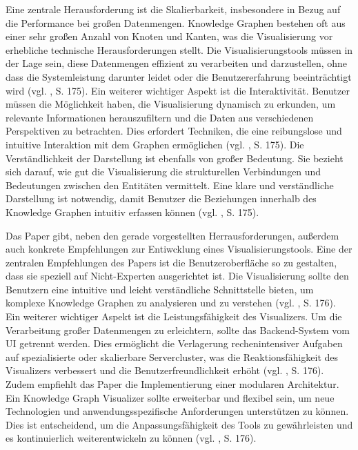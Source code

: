 Eine zentrale Herausforderung ist die Skalierbarkeit, insbesondere in Bezug auf die Performance bei großen Datenmengen. Knowledge Graphen bestehen oft aus einer sehr großen Anzahl von Knoten und Kanten, was die Visualisierung vor erhebliche technische Herausforderungen stellt. Die Visualisierungstools müssen in der Lage sein, diese Datenmengen effizient zu verarbeiten und darzustellen, ohne dass die Systemleistung darunter leidet oder die Benutzererfahrung beeinträchtigt wird (vgl. \cite{kgVisualization:Nararatwong}, S. 175).  Ein weiterer wichtiger Aspekt ist die Interaktivität. Benutzer müssen die Möglichkeit haben, die Visualisierung dynamisch zu erkunden, um relevante Informationen herauszufiltern und die Daten aus verschiedenen Perspektiven zu betrachten. Dies erfordert Techniken, die eine reibungslose und intuitive Interaktion mit dem Graphen ermöglichen (vgl. \cite{kgVisualization:Nararatwong}, S. 175). Die Verständlichkeit der Darstellung ist ebenfalls von großer Bedeutung. Sie bezieht sich darauf, wie gut die Visualisierung die strukturellen Verbindungen und Bedeutungen zwischen den Entitäten vermittelt. Eine klare und verständliche Darstellung ist notwendig, damit Benutzer die Beziehungen innerhalb des Knowledge Graphen intuitiv erfassen können (vgl. \cite{kgVisualization:Nararatwong}, S. 175).

Das Paper gibt, neben den gerade vorgestellten Herrausforderungen, außerdem auch konkrete Empfehlungen zur Entiwcklung eines Visualisierungstools. Eine der zentralen Empfehlungen des Papers ist die Benutzeroberfläche so zu gestalten, dass sie speziell auf Nicht-Experten ausgerichtet ist. Die Visualisierung sollte den Benutzern eine intuitive und leicht verständliche Schnittstelle bieten, um komplexe Knowledge Graphen zu analysieren und zu verstehen (vgl. \cite{kgVisualization:Nararatwong}, S. 176). Ein weiterer wichtiger Aspekt ist die Leistungsfähigkeit des Visualizers. Um die Verarbeitung großer Datenmengen zu erleichtern, sollte das Backend-System vom UI getrennt werden. Dies ermöglicht die Verlagerung rechenintensiver Aufgaben auf spezialisierte oder skalierbare Servercluster, was die Reaktionsfähigkeit des Visualizers verbessert und die Benutzerfreundlichkeit erhöht (vgl. \cite{kgVisualization:Nararatwong}, S. 176). Zudem empfiehlt das Paper die Implementierung einer modularen Architektur. Ein Knowledge Graph Visualizer sollte erweiterbar und flexibel sein, um neue Technologien und anwendungsspezifische Anforderungen unterstützen zu können. Dies ist entscheidend, um die Anpassungsfähigkeit des Tools zu gewährleisten und es kontinuierlich weiterentwickeln zu können (vgl. \cite{kgVisualization:Nararatwong}, S. 176).

